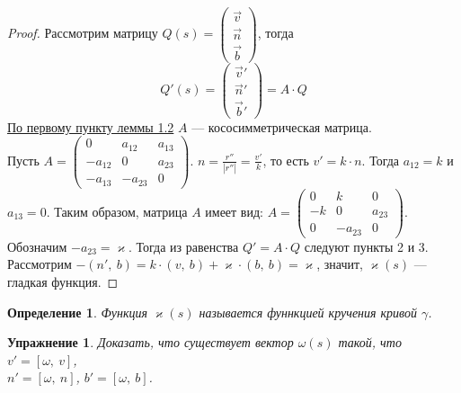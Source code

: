 \documentclass[12pt]{article}
\theoremstyle{plain}
\newtheorem*{exercise}{Упражнение}
\newtheorem{definition}{Определение}[section]
\begin{document}
    \begin{proof}
        Рассмотрим матрицу $Q(s)=\begin{pmatrix}
            \vec{v}\\
            \vec{n}\\
            \vec{b}
        \end{pmatrix}$, тогда $$Q'(s)=\begin{pmatrix}
            \vec{v}'\\
            \vec{n}'\\
            \vec{b}'
        \end{pmatrix}=A\cdot Q$$\hyperlink{3}{По первому пункту леммы 1.2} $A$ --- кососимметрическая матрица.\\Пусть $A=\begin{pmatrix}
            0 & a_{12} & a_{13}\\
            -a_{12} & 0 & a_{23}\\
            -a_{13} & -a_{23} & 0
        \end{pmatrix}$. $n=\frac{r''}{|r''|}=\frac{v'}{k}$, то есть $v'=k\cdot n$. Тогда $a_{12}=k$ и $a_{13}=0$. Таким образом, матрица $A$ имеет вид: $A=\begin{pmatrix}
            0 & k & 0\\
            -k & 0 & a_{23}\\
            0 & -a_{23} & 0
        \end{pmatrix}$. Обозначим $-a_{23}=\varkappa$. Тогда из равенства $Q'=A\cdot Q$ следуют пункты 2 и 3.\\
        Рассмотрим $-(n', \ b)=k\cdot(v, \ b)+\varkappa\cdot(b, \ b)=\varkappa$, значит, $\varkappa(s)$ --- гладкая функция.
    \end{proof}
    \begin{definition}
        Функция $\varkappa(s)$ называется фуннкцией кручения кривой $\gamma$.
    \end{definition}
    \begin{exercise}
        Доказать, что существует вектор $\omega(s)$ такой, что $v'=[\omega, \ v]$,\\$n'=[\omega, \ n]$, $b'=[\omega, \ b]$.
    \end{exercise}
\end{document}
